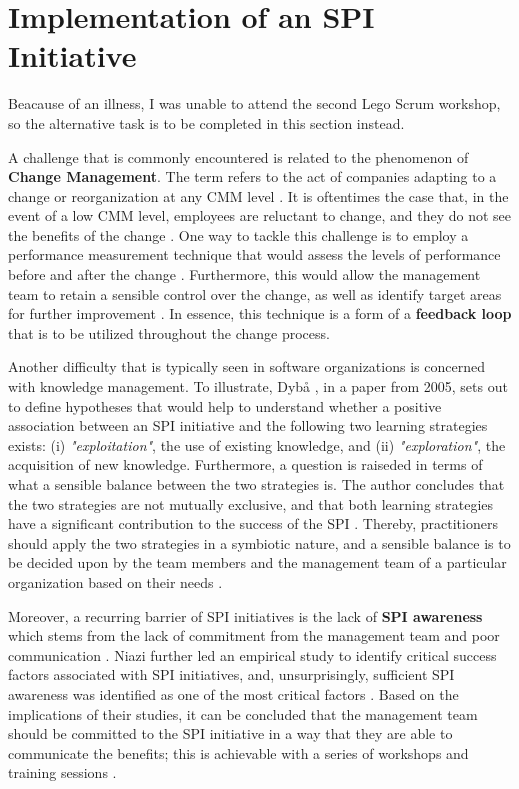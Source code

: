 \documentclass[conference]{IEEEtran}
\begin{document}
\section{Implementation of an SPI Initiative}
\label{sec:implementation}

Beacause of an illness, I was unable to attend the second Lego Scrum workshop,
so the alternative task is to be completed in this section instead.

A challenge that is commonly encountered is related to the phenomenon of
\textbf{Change Management}. The term refers to the act of companies adapting
to a change or reorganization at any CMM level \cite{Beecham2003}. It is
oftentimes the case that, in the event of a low CMM level, employees are
reluctant to change, and they do not see the benefits of the change
\cite{Beecham2003}. One way to tackle this challenge is to employ a performance
measurement technique that would assess the levels of performance before and
after the change \cite{Oakland2007}. Furthermore, this would allow the
management team to retain a sensible control over the change, as well as
identify target areas for further improvement \cite{Oakland2007}. In essence,
this technique is a form of a \textbf{feedback loop} that is to be utilized
throughout the change process.

Another difficulty that is typically seen in software organizations is concerned
with knowledge management. To illustrate, Dybå \cite{Dyba2005}, in a paper from
2005, sets out to define hypotheses that would help to understand whether
a positive association between an SPI initiative and the following two learning
strategies exists: (i) \textit{"exploitation"}, the use of existing knowledge,
and (ii) \textit{"exploration"}, the acquisition of new knowledge. Furthermore,
a question is raiseded in terms of what a sensible balance between the two
strategies is. The author concludes that the two strategies are not mutually
exclusive, and that both learning strategies have a significant contribution to
the success of the SPI \cite{Dyba2005}. Thereby, practitioners should apply the
two strategies in a symbiotic nature, and a sensible balance is to be decided
upon by the  team members and the management team of a particular organization
based on their needs \cite{Dyba2005}.

Moreover, a recurring barrier of SPI initiatives is the lack of \textbf{SPI
awareness} which stems from the lack of commitment from the management team
and poor communication \cite{Niazi2010}. Niazi further led an empirical study 
to identify critical success factors associated with SPI initiatives, and,
unsurprisingly, sufficient SPI awareness was identified as one of the most
critical factors \cite{Niazi2006}. Based on the implications of their studies,
it can be concluded that the management team should be committed to the SPI
initiative in a way that they are able to communicate the benefits; this is
achievable with a series of workshops and training sessions \cite{Niazi2006}.
\end{document}
